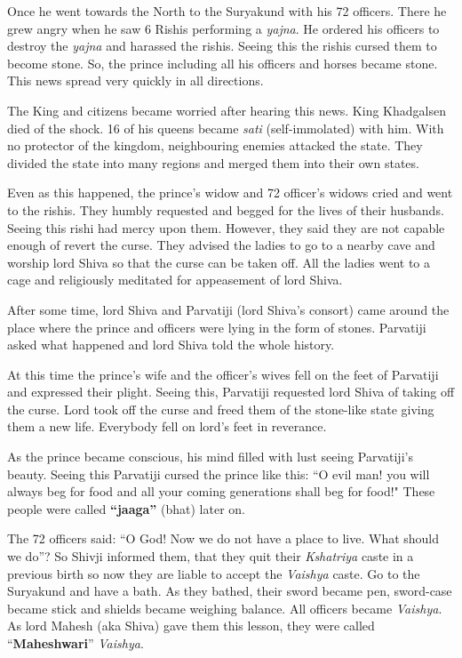 Once he went towards the North to the Suryakund with his 72 officers. There he
grew angry when he saw 6 Rishis performing a \textit{yajna}. He ordered his
officers to destroy the \textit{yajna} and harassed the rishis. Seeing this the
rishis cursed them to become stone. So, the prince including all his officers
and horses became stone. This news spread very quickly in all directions.

The King and citizens became worried after hearing this news. King Khadgalsen
died of the shock. 16 of his queens became \textit{sati} (self-immolated) with
him. With no protector of the kingdom, neighbouring enemies attacked the state.
They divided the state into many regions and merged them into their own states.

Even as this happened, the prince's widow and 72 officer's widows cried and
went to the rishis. They humbly requested and begged for the lives of their
husbands. Seeing this rishi had mercy upon them. However, they said they are
not capable enough of revert the curse. They advised the ladies to go to a
nearby cave and worship lord Shiva so that the curse can be taken off. All the
ladies went to a cage and religiously meditated for appeasement of lord Shiva.

After some time, lord Shiva and Parvatiji (lord Shiva's consort) came around
the place where the prince and officers were lying in the form of stones.
Parvatiji asked what happened and lord Shiva told the whole history.

At this time the prince's wife and the officer's wives fell on the feet of
Parvatiji and expressed their plight. Seeing this, Parvatiji requested lord
Shiva of taking off the curse. Lord took off the curse and freed them of the
stone-like state giving them a new life. Everybody fell on lord's feet in
reverance.

As the prince became conscious, his mind filled with lust seeing Parvatiji's
beauty. Seeing this Parvatiji cursed the prince like this: ``O evil man! you
will always beg for food and all your coming generations shall beg for food!"
These people were called \textbf{``jaaga''} (bhat) later on.

The 72 officers said: ``O God! Now we do not have a place to live. What should
we do''? So Shivji informed them, that they quit their \textit{Kshatriya} caste
in a previous birth so now they are liable to accept the \textit{Vaishya}
caste. Go to the Suryakund and have a bath. As they bathed, their sword became
pen, sword-case became stick and shields became weighing balance. All officers
became \textit{Vaishya}. As lord Mahesh (aka Shiva) gave them this lesson, they
were called ``\textbf{Maheshwari}'' \textit{Vaishya}.

